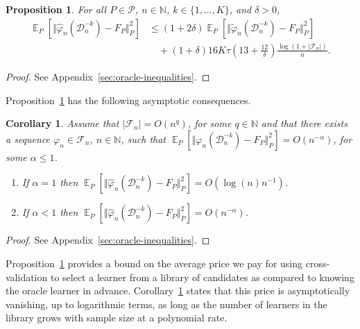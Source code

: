 \documentclass[a4paper,danish]{article}
\theoremstyle{plain} %
\numberwithin{theorem}{section}
\newtheorem{proposition}[theorem]{Proposition}
\newtheorem{corollary}[theorem]{Corollary}
\theoremstyle{definition} %
\theoremstyle{remark}
\DeclareMathOperator{\E}{\mathbb{E}} %
\newcommand{\N}{\mathbb{N}}
\renewcommand{\phi}{\varphi}
\newcommand\bigO{\textit{O}}
\newcommand{\1}{\mathds{1}}
\newcommand{\data}{\ensuremath{\mathcal{D}}}
\begin{document}
\begin{proposition}
  \label{prop:oracle-prop}
  For all \(P\in\mathcal{P}\), \( n \in \N \), \( k \in \{1, \dots, K\} \),
  and $\delta>0$,
  \begin{align*}
    \E_{P}{\left[ \Vert \hat{\phi}_n(\data_n^{-k}) - F_P \Vert_{P}^2 \right]}
    & \leq (1 + 2\delta)
      \E_{P}{\left[ \Vert \tilde{\phi}_n(\data_n^{-k}) - F_P \Vert_{P}^2 \right]}
    \\
    & \quad
      + (1+ \delta) 16   K \tau
      \left(
      13 + \frac{12}{\delta}
      \right)
      \frac{\log(1 + |\mathcal{F}_n|)}{n}.
  \end{align*}
\end{proposition}
\begin{proof}
  See Appendix~\ref{sec:oracle-inequalities}.
\end{proof}

Proposition~\ref{prop:oracle-prop} has the following
asymptotic consequences.

\begin{corollary}
  \label{cor:asymp-cons}
  Assume that \( |\mathcal{F}_n| = \bigO(n^q)\), for some \( q \in \N \) and
  that there exists a sequence \( \phi_n \in \mathcal{F}_n \), \( n \in \N \),
  such that
  \( \E_{P}{\left[ \Vert \phi_n(\data_n^{-k}) - F_P \Vert_{P}^2 \right]} =
  \bigO(n^{-\alpha}) \), for some \( \alpha\leq 1 \).
  \begin{enumerate}[label=(\alph*)]
  \item If $\alpha=1$ then
    \( \E_{P}{\left[ \Vert \hat{\phi}_n(\data_n^{-k}) - F_P \Vert_{P}^2
      \right]} = \bigO(\log(n)n^{-1}) \).
  \item If $\alpha<1$ then
    \( \E_{P}{\left[ \Vert \hat{\phi}_n(\data_n^{-k}) - F_P \Vert_{P}^2 \right]} =
    \bigO(n^{-\alpha}) \).
  \end{enumerate}
\end{corollary}
\begin{proof}
  See Appendix~\ref{sec:oracle-inequalities}.
\end{proof}

Proposition~\ref{prop:oracle-prop} provides a bound on the
average price we pay for using cross-validation to select a
learner from a library of candidates as compared to knowing
the oracle learner in advance. Corollary~\ref{cor:asymp-cons}
states that this price is asymptotically vanishing, up to
logarithmic terms, as long as the number of learners in the
library grows with sample size at a polynomial rate.
\end{document}
